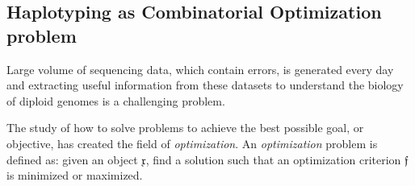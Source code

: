 
\subsection{Haplotyping as Combinatorial Optimization problem}
Large volume of sequencing data, which contain errors, is generated every day and extracting useful information from these datasets to understand the biology of diploid genomes is a challenging problem. 

The study of how to solve problems to achieve the best possible goal, or objective, has created the field of \textit{optimization}.
An \textit{optimization} problem is defined as: given an object $\mathfrak{x}$, find a solution such that an optimization criterion $\mathfrak{f}$ is minimized or maximized.



